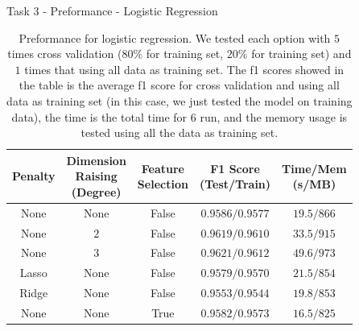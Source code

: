 \documentclass{beamer}
\begin{document}
\begin{frame}{Task 3 - Preformance - Logistic Regression}

  \begin{table}[H]
    \centering
    \begin{tabular}{|c|c|c|c|c|}
      \hline
      Penalty & \makecell{Dimension                                        \\ Raising \\ (Degree)} & \makecell{Feature \\ Selection} & \makecell{F1 Score \\ (Test/Train)} & \makecell{Time/Mem \\ (s/MB)} \\
      \hline
      None    & None                & False & $0.9586/0.9577$ & $19.5/866$ \\
      \hline
      None    & $2$                 & False & $0.9619/0.9610$ & $33.5/915$ \\
      \hline
      None    & $3$                 & False & $0.9621/0.9612$ & $49.6/973$ \\
      \hline
      Lasso   & None                & False & $0.9579/0.9570$ & $21.5/854$ \\
      \hline
      Ridge   & None                & False & $0.9553/0.9544$ & $19.8/853$ \\
      \hline
      None    & None                & True  & $0.9582/0.9573$ & $16.5/825$ \\
      \hline
    \end{tabular}
    \caption{Preformance for logistic regression. We tested each option with $5$ times cross validation ($80\%$ for training set, $20\%$ for training set) and $1$ times that using all data as training set. The f1 scores showed in the table is the average f1 score for cross validation and using all data as training set (in this case, we just tested the model on training data), the time is the total time for $6$ run, and the memory usage is tested using all the data as training set.}
  \end{table}

\end{frame}
\end{document}

